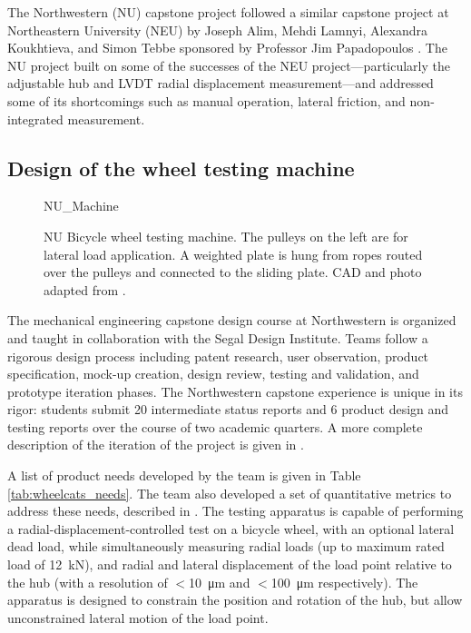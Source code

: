 \documentclass[\rootdir/thesis.tex]{subfiles}
\begin{document}
The Northwestern (NU) capstone project followed a similar capstone project at Northeastern University (NEU) by Joseph Alim, Mehdi Lamnyi, Alexandra Koukhtieva, and Simon Tebbe sponsored by Professor Jim Papadopoulos \cite{Alim2016}. The NU project built on some of the successes of the NEU project---particularly the adjustable hub and LVDT radial displacement measurement---and addressed some of its shortcomings such as manual operation, lateral friction, and non-integrated measurement.

\subsection{Design of the wheel testing machine}

\begin{figure}
\centering
{NU_Machine}
\caption{NU Bicycle wheel testing machine. The pulleys on the left are for lateral load application. A weighted plate is hung from ropes routed over the pulleys and connected to the sliding plate. CAD and photo adapted from \cite{WheelCats2018}.}
\label{fig:NU_Machine}
\end{figure}

The mechanical engineering capstone design course at Northwestern is organized and taught in collaboration with the Segal Design Institute. Teams follow a rigorous design process including patent research, user observation, product specification, mock-up creation, design review, testing and validation, and prototype iteration phases. The Northwestern capstone experience is unique in its rigor: students submit 20 intermediate status reports and 6 product design and testing reports over the course of two academic quarters. A more complete description of the iteration of the project is given in \cite{WheelCats2018}.

A list of product needs developed by the team is given in Table \ref{tab:wheelcats_needs}. The team also developed a set of quantitative metrics to address these needs, described in \cite{WheelCats2018}. The testing apparatus is capable of performing a radial-displacement-controlled test on a bicycle wheel, with an optional lateral dead load, while simultaneously measuring radial loads (up to maximum rated load of \SI{12}{\kilo\newton}), and radial and lateral displacement of the load point relative to the hub (with a resolution of $<$\SI{10}{\micro\meter} and $<$\SI{100}{\micro\meter} respectively). The apparatus is designed to constrain the position and rotation of the hub, but allow unconstrained lateral motion of the load point.
\end{document}
